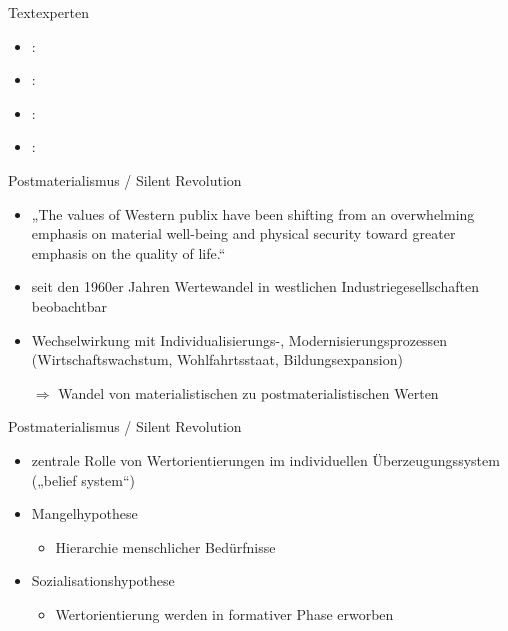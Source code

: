 \documentclass[11pt]{beamer}
\begin{document}
\begin{frame}{Textexperten}
	\begin{itemize}
		\item \cite{Welzel2013}: 
		\item \cite{Inglehart2010}: 
		\item \cite{Scherer2020}:
		\item \cite{Welzel2009}:
	\end{itemize}
\end{frame}

\begin{frame}{Postmaterialismus / Silent Revolution \parencite{Inglehart1977}}
	\begin{itemize}
		\item „The values of Western publix have been shifting from an overwhelming emphasis on material well-being and physical security toward greater emphasis on the quality of life.“ \parencite[1]{Inglehart1977}
		\item seit den 1960er Jahren Wertewandel in westlichen Industriegesellschaften beobachtbar
		\item Wechselwirkung mit Individualisierungs-, Modernisierungsprozessen (Wirtschaftswachstum, Wohlfahrtsstaat, Bildungsexpansion)
		\item[$\Rightarrow$] Wandel von materialistischen zu postmaterialistischen Werten
	\end{itemize}		

\end{frame}

\begin{frame}{Postmaterialismus / Silent Revolution \parencite{Inglehart1977}}
	\begin{itemize}
		\item zentrale Rolle von Wertorientierungen im individuellen Überzeugungssystem („belief system“)
		\item Mangelhypothese
			\begin{itemize}
				\item Hierarchie menschlicher Bedürfnisse \parencite{Maslow1943}
			\end{itemize}
		\item Sozialisationshypothese
			\begin{itemize}
				\item Wertorientierung werden in formativer Phase erworben
			\end{itemize}						
	\end{itemize}		
\end{frame}
\end{document}
